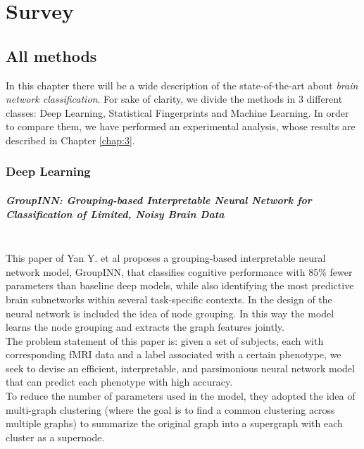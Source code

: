 \chapter{Survey}
\label{chap:2} 

\section{All methods}
In this chapter there will be a wide description of the state-of-the-art about \textit{brain network classification}. For sake of clarity, we divide the methods in 3 different classes: Deep Learning, Statistical Fingerprints and Machine Learning. In order to compare them, we have performed an experimental analysis, whose results are described in Chapter \ref{chap:3}.

\subsection{Deep Learning}
\paragraph{GroupINN: Grouping-based Interpretable Neural Network for Classification of Limited, Noisy Brain Data}\
\\

This paper of Yan Y. et al \cite{groupinn} proposes a grouping-based interpretable neural network model, GroupINN, that classifies cognitive performance with 85\% fewer parameters than baseline deep models, while also identifying the most predictive brain subnetworks within several task-specific contexts. In the design of the neural network is included the idea of node grouping. In this way the model learns the node grouping and extracts the graph features jointly.
\\

The problem statement of this paper is: given a set of subjects, each with corresponding fMRI data and a label associated with a certain phenotype, we seek to devise an efficient, interpretable, and parsimonious neural network model that can predict each phenotype with high accuracy.
\\

To reduce the number of parameters used in the model, they adopted the idea of multi-graph clustering (where the goal is to find a common clustering across multiple graphs) to summarize the original graph into a supergraph with each cluster as a supernode. 
\\

